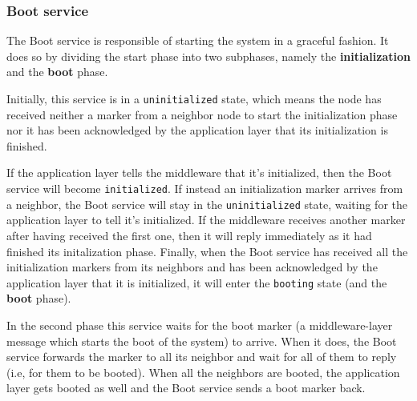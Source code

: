 \subsubsection{Boot service}

The Boot service is responsible of starting the system in a graceful fashion.
It does so by dividing the start phase into two subphases, namely the
\textbf{initialization} and the \textbf{boot} phase.

Initially, this service is in a \texttt{uninitialized} state, which means the
node has received neither a marker from a neighbor node to start the
initialization phase nor it has been acknowledged by the application layer that
its initialization is finished.

If the application layer tells the middleware that it's initialized, then the
Boot service will become \texttt{initialized}. If instead an initialization
marker arrives from a neighbor, the Boot service will stay in the
\texttt{uninitialized} state, waiting for the application layer to tell it's
initialized.
If the middleware receives another marker after having received the first one,
then it will reply immediately as it had finished its initalization phase.
Finally, when the Boot service has received all the initialization markers from
its neighbors and has been acknowledged by the application layer that it is
initialized, it will enter the \texttt{booting} state (and the \textbf{boot}
phase).

In the second phase this service waits for the boot marker (a middleware-layer
message which starts the boot of the system) to arrive. When it does, the Boot
service forwards the marker to all its neighbor and wait for all of them to
reply (i.e, for them to be booted).
When all the neighbors are booted, the application layer gets booted as
well and the Boot service sends a boot marker back.
